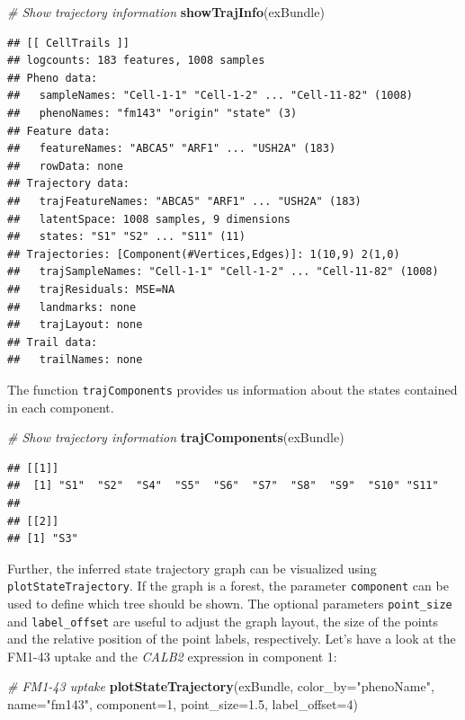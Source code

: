\documentclass[]{book}
\newenvironment{Shaded}{\begin{snugshade}}{\end{snugshade}}
\newcommand{\KeywordTok}[1]{\textcolor[rgb]{0.13,0.29,0.53}{\textbf{#1}}}
\newcommand{\DataTypeTok}[1]{\textcolor[rgb]{0.13,0.29,0.53}{#1}}
\newcommand{\DecValTok}[1]{\textcolor[rgb]{0.00,0.00,0.81}{#1}}
\newcommand{\FloatTok}[1]{\textcolor[rgb]{0.00,0.00,0.81}{#1}}
\newcommand{\StringTok}[1]{\textcolor[rgb]{0.31,0.60,0.02}{#1}}
\newcommand{\CommentTok}[1]{\textcolor[rgb]{0.56,0.35,0.01}{\textit{#1}}}
\newcommand{\NormalTok}[1]{#1}
\theoremstyle{definition}
\theoremstyle{definition}
\theoremstyle{definition}
\theoremstyle{remark}
\begin{document}
\begin{Shaded}
\begin{Highlighting}[]
\CommentTok{# Show trajectory information}
\KeywordTok{showTrajInfo}\NormalTok{(exBundle)}
\end{Highlighting}
\end{Shaded}

\begin{verbatim}
## [[ CellTrails ]] 
## logcounts: 183 features, 1008 samples
## Pheno data: 
##   sampleNames: "Cell-1-1" "Cell-1-2" ... "Cell-11-82" (1008)
##   phenoNames: "fm143" "origin" "state" (3)
## Feature data: 
##   featureNames: "ABCA5" "ARF1" ... "USH2A" (183)
##   rowData: none
## Trajectory data: 
##   trajFeatureNames: "ABCA5" "ARF1" ... "USH2A" (183)
##   latentSpace: 1008 samples, 9 dimensions
##   states: "S1" "S2" ... "S11" (11)
## Trajectories: [Component(#Vertices,Edges)]: 1(10,9) 2(1,0)
##   trajSampleNames: "Cell-1-1" "Cell-1-2" ... "Cell-11-82" (1008)
##   trajResiduals: MSE=NA
##   landmarks: none
##   trajLayout: none
## Trail data: 
##   trailNames: none
\end{verbatim}

The function \texttt{trajComponents} provides us information about the
states contained in each component.

\begin{Shaded}
\begin{Highlighting}[]
\CommentTok{# Show trajectory information}
\KeywordTok{trajComponents}\NormalTok{(exBundle)}
\end{Highlighting}
\end{Shaded}

\begin{verbatim}
## [[1]]
##  [1] "S1"  "S2"  "S4"  "S5"  "S6"  "S7"  "S8"  "S9"  "S10" "S11"
## 
## [[2]]
## [1] "S3"
\end{verbatim}

Further, the inferred state trajectory graph can be visualized using
\texttt{plotStateTrajectory}. If the graph is a forest, the parameter
\texttt{component} can be used to define which tree should be shown. The
optional parameters \texttt{point\_size} and \texttt{label\_offset} are
useful to adjust the graph layout, the size of the points and the
relative position of the point labels, respectively. Let's have a look
at the FM1-43 uptake and the \emph{CALB2} expression in component 1:

\begin{Shaded}
\begin{Highlighting}[]
\CommentTok{# FM1-43 uptake}
\KeywordTok{plotStateTrajectory}\NormalTok{(exBundle, }\DataTypeTok{color_by=}\StringTok{"phenoName"}\NormalTok{, }\DataTypeTok{name=}\StringTok{"fm143"}\NormalTok{, }
                    \DataTypeTok{component=}\DecValTok{1}\NormalTok{, }\DataTypeTok{point_size=}\FloatTok{1.5}\NormalTok{, }\DataTypeTok{label_offset=}\DecValTok{4}\NormalTok{)}
\end{Highlighting}
\end{Shaded}
\end{document}
